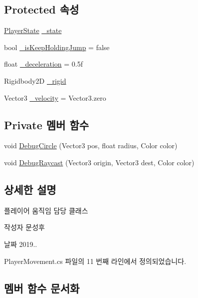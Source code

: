 \subsection*{Protected 속성}
\begin{DoxyCompactItemize}
\item 
\mbox{\hyperlink{class_player_state}{Player\+State}} \mbox{\hyperlink{class_player_movement_af88a64a22da9ba3a831b0fe31bd8e7db}{\+\_\+state}}
\item 
bool \mbox{\hyperlink{class_player_movement_a7f5487a5ea2c26c405c0bd2c8c795db6}{\+\_\+is\+Keep\+Holding\+Jump}} = false
\item 
float \mbox{\hyperlink{class_player_movement_accf40aeeabcd73e5aefa1ced890c167d}{\+\_\+deceleration}} = 0.\+5f
\item 
Rigidbody2D \mbox{\hyperlink{class_movement_a8b24a93b5f529e53c668ff81bde13c0d}{\+\_\+rigid}}
\item 
Vector3 \mbox{\hyperlink{class_movement_a6ea6768262f1dca968be8ee5c14a0cc1}{\+\_\+velocity}} = Vector3.\+zero
\end{DoxyCompactItemize}
\subsection*{Private 멤버 함수}
\begin{DoxyCompactItemize}
\item 
void \mbox{\hyperlink{class_player_movement_a6f77ea4796901d5e2a476e2f8ec49b51}{Debug\+Circle}} (Vector3 pos, float radius, Color color)
\item 
void \mbox{\hyperlink{class_player_movement_a10abf2ced0397cbfa0cc29a0296023fb}{Debug\+Raycast}} (Vector3 origin, Vector3 dest, Color color)
\end{DoxyCompactItemize}


\subsection{상세한 설명}
플레이어 움직임 담당 클래스 

\begin{DoxyAuthor}{작성자}
문성후 
\end{DoxyAuthor}
\begin{DoxyDate}{날짜}
2019.. 
\end{DoxyDate}


Player\+Movement.\+cs 파일의 11 번째 라인에서 정의되었습니다.



\subsection{멤버 함수 문서화}
\mbox{\label{class_movement_a132e2f7bc0af811ff3b1ab86c8d1f090}} 
